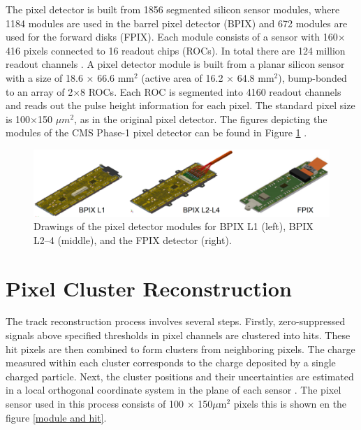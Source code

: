 The pixel detector is built from 1856 segmented silicon sensor modules, where 1184 modules are used in the barrel pixel detector (BPIX) and 672 modules are used for the forward disks (FPIX). Each module consists of a sensor with 160$\times$416 pixels connected to 16 readout chips (ROCs). In total there are 124 million readout channels \cite{phase1_Pixel_Detector}.
A pixel detector module is built from a planar silicon sensor with a size of 18.6 $\times$ 66.6 $\text{mm}^{2}$ (active area of 16.2 $\times$ 64.8 $\text{mm}^{2}$), bump-bonded to an array of 2$\times$8 ROCs. Each ROC is segmented into 4160 readout channels and reads out the pulse height information for each pixel. The standard pixel size is 100$\times$150 $\mu m^{2}$, as in the original pixel detector.
The figures depicting the modules of the CMS Phase-1 pixel detector can be found in Figure \ref{modules_drawing} \cite{phase1_Pixel_Detector}.

\begin{center}
  \begin{figure}[h]
    \centering
    \includegraphics[scale=.2]{Chapter2/modules_drawing.png}
    \caption[Pixel detector modules]{ Drawings of the pixel detector modules for BPIX L1 (left), BPIX L2–4 (middle), and the FPIX detector (right)\cite{phase1_Pixel_Detector}.}
    \label{modules_drawing}
  \end{figure}
\end{center}

\section{Pixel Cluster Reconstruction}

The track reconstruction process involves several steps. Firstly, zero-suppressed signals above specified thresholds in pixel channels are clustered into hits. These hit pixels are then combined to form clusters from neighboring pixels. The charge measured within each cluster corresponds to the charge deposited by a single charged particle. Next, the cluster positions and their uncertainties are estimated in a local orthogonal coordinate system  in the plane of each sensor \cite{Track_Reco_2014}. The pixel sensor used in this process consists of 100 $\times$ 150$\mu \text{m}^{2}$ pixels  this is shown en the figure \ref{module and hit}. 

